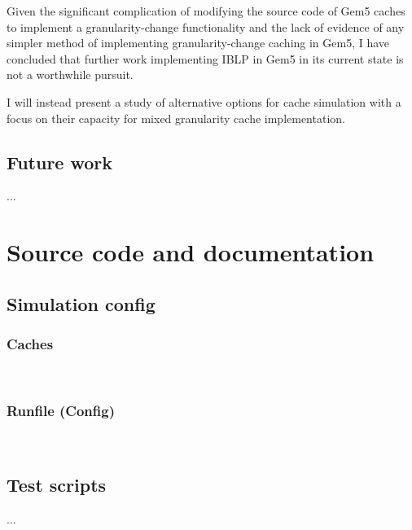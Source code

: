 \documentclass[12pt,twoside]{reedthesis}
\begin{document}
	Given the significant complication of modifying the source code of Gem5 caches to implement a granularity-change functionality and the lack of evidence of any simpler method of implementing granularity-change caching in Gem5, I have concluded that further work implementing IBLP in Gem5 in its current state is not a worthwhile pursuit.

	I will instead present a study of alternative options for cache simulation with a focus on their capacity for mixed granularity cache implementation.

\section{Future work}

...

\appendix

\chapter{Source code and documentation}

\section{Simulation config}

\subsection*{Caches}
%
\;\\

\subsection*{Runfile (Config)}
%
\;\\

\section{Test scripts}

...

\backmatter %

\nocite{*}
\printbibliography[title=References]
\end{document}
